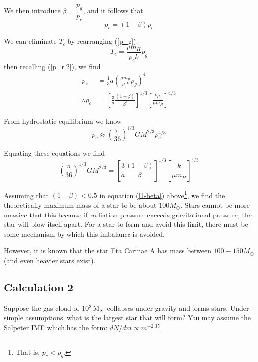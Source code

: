 \documentclass[a4paper]{article} %
\newcommand{\ms}[1]{\SI{#1}{M_{\odot}}}
\begin{document}
We then introduce $\beta=\dfrac{p_g}{p_c}$, and it follows that
\begin{equation*}
p_r=(1-\beta)p_c
\end{equation*}

We can eliminate $T_c$ by rearranging (\ref{p_g}):
\begin{equation}
T_c=\frac{\mu m_H}{\rho_c k}p_g
\end{equation}
then recalling (\ref{p_r 2}), we find
\begin{align*}
p_r&=\frac{1}{3}a\left(\frac{\mu m_H}{\rho_c k}p_g\right)^4\\
\therefore \rho_c&=\left[\frac{3}{a}\frac{(1-\beta)}{\beta^4}\right]^{1/3}\left[\frac{k\rho_c}{\mu m_H}\right]^{4/3}
\end{align*}

From hydrostatic equilibrium\cite{MinMaxMass} we know
\begin{equation}
p_c\approx \left(\frac{\pi}{36}\right)^{1/3}GM^{2/3}\rho_c^{4/3}
\end{equation}

Equating these equations we find
\begin{equation}
\left(\frac{\pi}{36}\right)^{1/3}GM^{2/3}=\left[\frac{3}{a}\frac{(1-\beta)}{\beta}\right]^{1/3}\left[\frac{k}{\mu m_H}\right]^{4/3}\label{1-beta}
\end{equation}

Assuming that $(1-\beta)<0.5$ in equation (\ref{1-beta}) above\footnote{That is, $p_c<p_g$.}, we find the theoretically maximum mass of a star to be about $100M_{\odot}$. Stars cannot be more massive that this because if radiation pressure exceeds gravitational pressure, the star will blow itself apart. For a star to form and avoid this limit, there must be some mechanism by which this imbalance is avoided.

However, it is known that the star Eta Carinae A has mass between $100-150M_{\odot}$ (and even heavier stars exist). 

\pagebreak

\subsection{Calculation 2}
\begin{framed}
Suppose the gas cloud of $\ms{d3}$ collapses under gravity and forms stars. Under simple assumptions, what is the largest star that will form? You may assume the Salpeter IMF which has the form: $dN/dm\propto m^{-2.35}$.
\end{framed}
\end{document}

